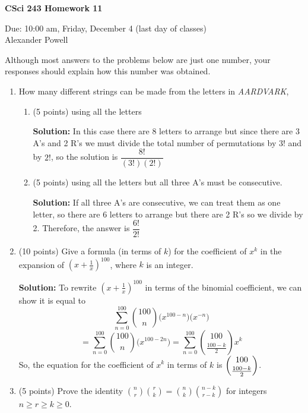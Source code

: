 \documentclass[11pt]{article}
\begin{document}
\begin{center}             %
\begin{LARGE}
{\bf CSci 243 Homework 11}
\end{LARGE}
\vskip 0.25cm      %

Due: 10:00 am, Friday, December 4 (last day of classes)\\  %
Alexander Powell
\end{center}
Although most answers to the problems below are just one number, 
 your responses should explain how this number was obtained.

\begin{enumerate}
\item 
How many different strings can be made from the letters in {\it AARDVARK}, 
\begin{enumerate}
\item (5 points) using all the letters

\textbf{Solution: }
In this case there are 8 letters to arrange but since there are 3 A's and 2 R's we must divide the total number of permutations by $3!$ and by $2!$, so the solution is $\dfrac{8!}{(3!)(2!)}$

\item (5 points) using all the letters but all three A's must be consecutive.

\textbf{Solution: }
If all three A's are consecutive, we can treat them as one letter, so there are 6 letters to arrange but there are 2 R's so we divide by 2.  Therefore, the answer is $\dfrac{6!}{2!}$

\end{enumerate}

\item (10 points) Give a formula (in terms of $k$) for the coefficient of 
$x^k$ in the expansion of $(x+\frac{1}{x})^{100}$, where $k$ is an integer.

\textbf{Solution: }
To rewrite $(x+\frac{1}{x})^{100}$ in terms of the binomial coefficient, we can show it is equal to 
$$ \sum\limits_{n=0}^{100}{100 \choose n}\bigg(x^{100-n}\bigg)\bigg(x^{-n}\bigg) $$
$$ = \sum\limits_{n=0}^{100}{100 \choose n}\bigg(x^{100-2n}\bigg) = \sum\limits_{n=0}^{100}{100 \choose \frac{100-k}{2}}x^k $$
So, the equation for the coefficient of $x^k$ in terms of $k$ is $\mathlarger{{100 \choose \frac{100-k}{2}}}$.  

\newpage

\item (5 points) Prove the identity ${n\choose r}{r\choose k}={n\choose k}{n-k\choose r-k}$ for integers $n\ge r\ge k\ge 0$.


\end{enumerate}
\end{document}
